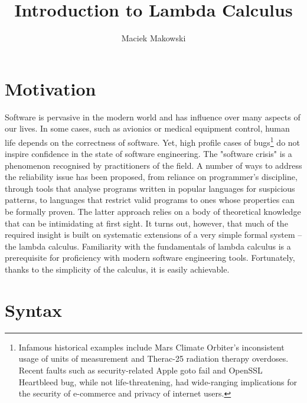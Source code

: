 \documentclass[11pt,twoside,a4paper]{article} %
\begin{document}
\title{Introduction to Lambda Calculus}
\author{Maciek Makowski}
\maketitle

\section{Motivation}

Software is pervasive in the modern world and has influence over many aspects 
of our lives. In some cases, such as avionics or medical equipment control, 
human life depends on the correctness of software. Yet, high profile cases of 
bugs\footnote{Infamous historical examples include Mars Climate 
Orbiter's inconsistent usage of units of measurement\cite{mco} and Therac-25 
radiation therapy overdoses\cite{therac25}. Recent faults such as
security-related Apple goto fail\cite{cve141266} and OpenSSL Heartbleed
bug\cite{cve140160},
while not life-threatening, had wide-ranging implications for the security of
e-commerce and privacy of internet users.} do not inspire confidence in the 
state of software engineering. The "software crisis" is a phenomenon recognised 
by practitioners of the field. A number of ways to address the reliability issue 
has been proposed, from reliance on programmer's 
discipline\cite{cleancode}\cite{securecoding}, through tools that
analyse programs written in popular languages for suspicious 
patterns\cite{raf04}, to languages that restrict valid programs to ones whose 
properties can be formally proven. The latter approach relies on a body of 
theoretical knowledge that can be intimidating at first sight. It turns out, 
however, that much of the required insight is built on systematic extensions of 
a very simple formal system -- the lambda calculus. Familiarity with the 
fundamentals of lambda calculus is a prerequisite for proficiency with modern 
software engineering tools. Fortunately, thanks to the simplicity of the 
calculus, it is easily achievable.

\section{Syntax}
\end{document}
